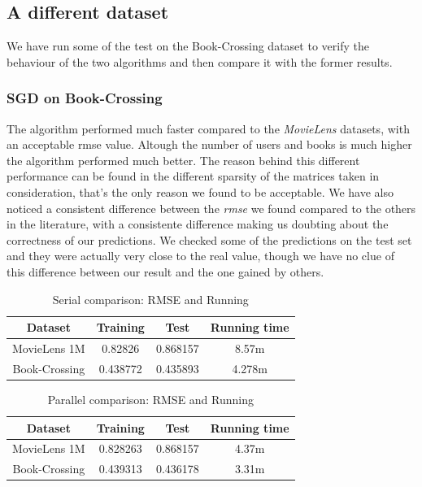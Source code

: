 \documentclass{sig-alternate-05-2015}
\begin{document}
\subsection{A different dataset}

We have run some of the test on the Book-Crossing dataset to verify
the behaviour of the two algorithms and then compare it with the former
results.

\subsubsection{SGD on Book-Crossing}

The algorithm performed much faster compared to the \textit{MovieLens}
datasets, with an acceptable rmse value. Altough the number of users and
books is much higher the algorithm performed much better. The reason behind
this different performance can be found in the different sparsity of the
matrices taken in consideration, that's the only reason we found to be acceptable.
We have also noticed a consistent difference between the \textit{rmse} we found
compared to the others in the literature, with a consistente difference making
us doubting about the correctness of our predictions. We checked some of the predictions
on the test set and they were actually very close to the real value, though we have
no clue of this difference between our result and the one gained by others.\cite{recommender}

\begin{table}
\centering
\caption{Serial comparison: RMSE and Running}
\begin{tabular}{|c|c|c|c|} \hline
\textbf{Dataset} & \textbf{Training} & \textbf{Test} & \textbf{Running time}\\ \hline
MovieLens 1M & 0.82826 & 0.868157 & 8.57m \\ \hline
Book-Crossing & 0.438772 & 0.435893 & 4.278m \\ \hline
\end{tabular}
\end{table}
\begin{table}
\centering
\caption{Parallel comparison: RMSE and Running}
\begin{tabular}{|c|c|c|c|} \hline
\textbf{Dataset} & \textbf{Training} & \textbf{Test} & \textbf{Running time}\\ \hline
MovieLens 1M & 0.828263 & 0.868157 & 4.37m \\ \hline
Book-Crossing &  0.439313 & 0.436178 & 3.31m \\ \hline
\end{tabular}
\end{table}
\end{document}
